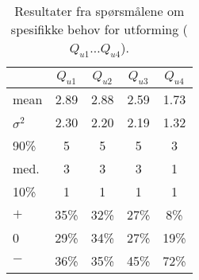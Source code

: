 

\begin{table}
    \caption{Resultater fra spørsmålene om spesifikke behov for
      utforming (\(Q_{u1} \dots Q_{u4}\)). }\label{tab:results:3}
\centering\small

\begin{tabular}{l|cccc}
      &  \(Q_{u1}\) & \(Q_{u2}\) & \(Q_{u3}\) & \(Q_{u4}\) \\
\hline
mean & 	2.89 &	2.88 &	2.59 &	1.73 \\
\(\sigma^2\) &	2.30 &	2.20 &	2.19 & 1.32 \\
\hline
90\% &  5 &	5 &	5 &	3\\
med.  & 	3 &	3 & 3 & 1\\
10\% & 	1 &	1 &	1 &	1\\
\hline
\(+\)  & 	35\%&	32\%&	27\%&	8\%\\
0      &	29\%&	34\%&	27\%&	19\%\\
\(-\)  &        36\%&	35\%&	45\%&	72\%\\

\end{tabular}
\end{table}

